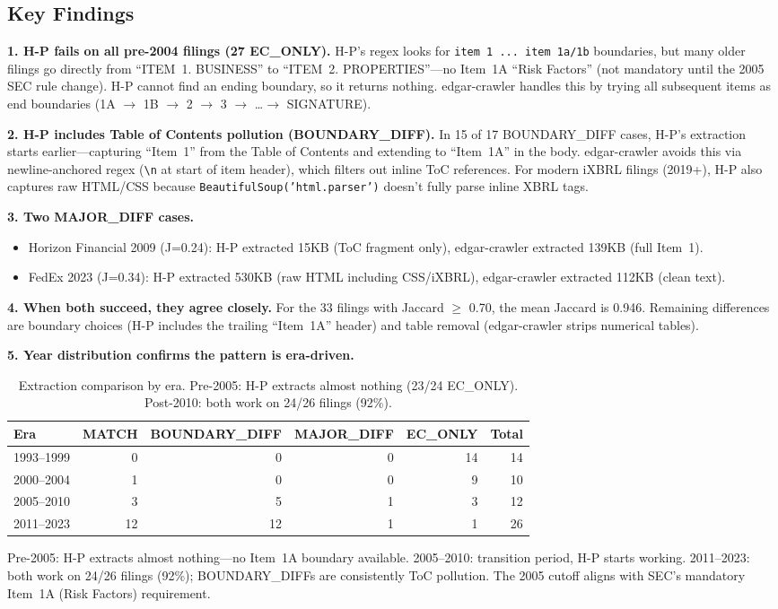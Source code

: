 \documentclass[11pt]{article}
\begin{document}
\subsection{Key Findings}

\textbf{1. H-P fails on all pre-2004 filings (27 EC\_ONLY).}
H-P's regex looks for \texttt{item 1 ... item 1a/1b} boundaries, but many older
filings go directly from ``ITEM~1. BUSINESS'' to ``ITEM~2. PROPERTIES''---no
Item~1A ``Risk Factors'' (not mandatory until the 2005 SEC rule change). H-P
cannot find an ending boundary, so it returns nothing. edgar-crawler handles this
by trying all subsequent items as end boundaries
(1A $\to$ 1B $\to$ 2 $\to$ 3 $\to$ \ldots $\to$ SIGNATURE).

\textbf{2. H-P includes Table of Contents pollution (BOUNDARY\_DIFF).}
In 15 of 17 BOUNDARY\_DIFF cases, H-P's extraction starts earlier---capturing
``Item~1'' from the Table of Contents and extending to ``Item~1A'' in the body.
edgar-crawler avoids this via newline-anchored regex (\texttt{\textbackslash n}
at start of item header), which filters out inline ToC references. For modern
iXBRL filings (2019+), H-P also captures raw HTML/CSS because
\texttt{BeautifulSoup('html.parser')} doesn't fully parse inline XBRL tags.

\textbf{3. Two MAJOR\_DIFF cases.}
\begin{itemize}
  \item Horizon Financial 2009 (J=0.24): H-P extracted 15KB (ToC fragment only),
    edgar-crawler extracted 139KB (full Item~1).
  \item FedEx 2023 (J=0.34): H-P extracted 530KB (raw HTML including
    CSS/iXBRL), edgar-crawler extracted 112KB (clean text).
\end{itemize}

\textbf{4. When both succeed, they agree closely.}
For the 33 filings with Jaccard $\geq$ 0.70, the mean Jaccard is 0.946.
Remaining differences are boundary choices (H-P includes the trailing ``Item~1A''
header) and table removal (edgar-crawler strips numerical tables).

\textbf{5. Year distribution confirms the pattern is era-driven.}

\begin{table}[h]
\centering
\begin{tabular}{lrrrrr}
\toprule
Era & MATCH & BOUNDARY\_DIFF & MAJOR\_DIFF & EC\_ONLY & Total \\
\midrule
1993--1999 & 0  & 0  & 0 & 14 & 14 \\
2000--2004 & 1  & 0  & 0 & 9  & 10 \\
2005--2010 & 3  & 5  & 1 & 3  & 12 \\
2011--2023 & 12 & 12 & 1 & 1  & 26 \\
\bottomrule
\end{tabular}
\caption{Extraction comparison by era. Pre-2005: H-P extracts almost nothing
(23/24 EC\_ONLY). Post-2010: both work on 24/26 filings (92\%).}
\end{table}

Pre-2005: H-P extracts almost nothing---no Item~1A boundary available. 2005--2010:
transition period, H-P starts working. 2011--2023: both work on 24/26 filings
(92\%); BOUNDARY\_DIFFs are consistently ToC pollution. The 2005 cutoff aligns
with SEC's mandatory Item~1A (Risk Factors) requirement.
\end{document}
